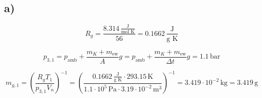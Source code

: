

\subsection*{a)}
\[
R_g = \frac{8.314 \, \frac{\text{J}}{\text{mol K}}}{56} = 0.1662 \, \frac{\text{J}}{\text{g K}}
\]

\[
p_{3,1} = p_{\text{amb}} + \frac{m_{K} + m_{\text{ew}}}{A} g = p_{\text{amb}} + \frac{m_{K} + m_{\text{ew}}}{\Delta t} g = 1.1 \, \text{bar}
\]

\[
m_{g,1} = \left( \frac{R_g T_{1}}{p_{3,1} V_{n}} \right)^{-1} = \left( \frac{0.1662 \, \frac{\text{J}}{\text{g K}} \cdot 293.15 \, \text{K}}{1.1 \cdot 10^5 \, \text{Pa} \cdot 3.19 \cdot 10^{-2} \, \text{m}^3} \right)^{-1} = 3.419 \cdot 10^{-2} \, \text{kg} = 3.419 \, \text{g}
\]